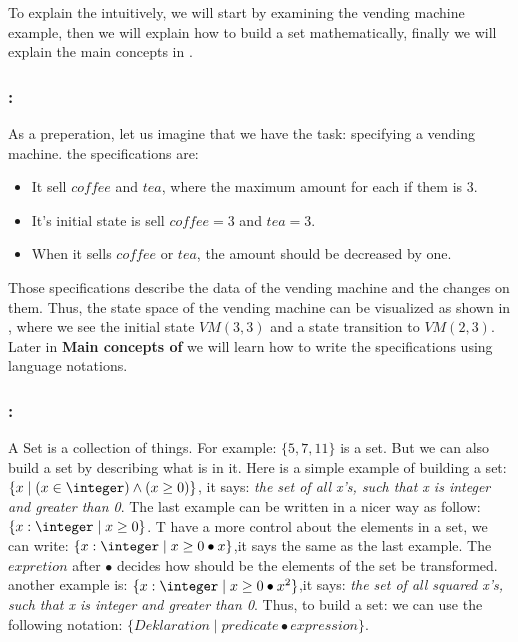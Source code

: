 To explain the \oz{} intuitively, we will start by examining the vending machine example, then we will explain how to build a set mathematically, finally we will explain the main concepts in \oz{}. 

\subsubsection{:}
As a preperation, let us imagine that we have the task: specifying a vending machine.
the specifications are:
\begin{itemize}
\item It sell $coffee$ and $tea$, where the maximum amount for each if them is 3.
\item It's initial state is  sell $coffee = 3$ and $tea = 3$.
\item When it sells $coffee$ or $tea$, the amount should be decreased by one.
\end{itemize} 
Those specifications describe the data of the vending machine and the changes on them. Thus, the state space of the vending machine can be visualized as shown in , where we see the initial state $VM(3,3)$ and a state transition to $VM(2,3)$. Later in \textbf{Main concepts of \oz{}} we will learn how to write the specifications using \oz{} language notations.


\subsubsection{:} A Set is a collection of things. For example: $\{5, 7, 11\}$ is a set.
But we can also build a set by describing what is in it.
Here is a simple example of building a set: $\{x \mid (x \in \integer) \wedge (x \geq 0) \}$, it says: \textit{the set of all x's, such that x is integer and greater than 0}. The last example can be written in a nicer way as follow: $\{x: \integer \mid x \geq 0 \}$. T have a more control about the elements in a set, we can write: $\{x: \integer \mid x \geq 0 \bullet x\}$,it says the same as the last example. The $expretion$ after $\bullet$ decides how should be the elements of the set be transformed. another example is: $\{x: \integer \mid x \geq 0 \bullet x^{2}\}$,it says: \textit{the set of all  squared x's, such that x is integer and greater than 0}. Thus, to build a set: we can use the following notation: $\{Deklaration \mid predicate \bullet expression \}$.
	
